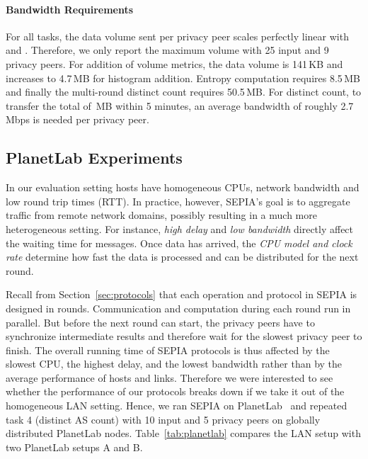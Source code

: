 \documentclass[letterpaper,11pt,onecolumn,titlepage]{article}
\begin{document}
\paragraph{Bandwidth Requirements}
For all tasks, the data volume sent per privacy peer scales perfectly linear
with  and . Therefore, we only report the maximum volume
with 25 input and 9 privacy peers. For addition of volume metrics, the data volume is 141\,KB and increases
to 4.7\,MB for histogram addition. Entropy computation requires 8.5\,MB and finally the multi-round distinct
count requires 50.5\,MB. For distinct count, to transfer the total of \,MB within
5 minutes, an average bandwidth of roughly 2.7\,Mbps is needed per privacy peer.


\subsection{PlanetLab Experiments}
\label{sec:eval_planetlab}

In our evaluation setting hosts have homogeneous CPUs, network bandwidth and low
round trip times (RTT). In practice, however, SEPIA's goal is to aggregate
traffic from remote network domains, possibly resulting in a much more heterogeneous setting.
For instance, \emph{high delay} and \emph{low bandwidth} directly affect the waiting time for
messages. Once data
has arrived, the \emph{CPU model and clock rate} determine how fast the data is processed
and can be distributed for the next round.



Recall from Section~\ref{sec:protocols} that each operation and protocol in SEPIA
is designed in rounds.
Communication and computation during each round run in parallel. But before the next round can start, the privacy peers
have to synchronize intermediate results and
therefore wait for the slowest privacy peer to finish. The overall running time
of SEPIA protocols is thus affected by the slowest CPU, the highest
delay, and the lowest bandwidth rather than by the average performance of hosts and links.
Therefore we were interested to see whether the performance of our protocols
breaks down if we take it out of the homogeneous LAN setting.
Hence, we ran SEPIA on PlanetLab~\cite{planetlab} and repeated task 4 (distinct AS count) with
10 input and 5 privacy peers on globally distributed PlanetLab nodes.
Table~\ref{tab:planetlab} compares the LAN setup with two PlanetLab setups A and B.
\end{document}
